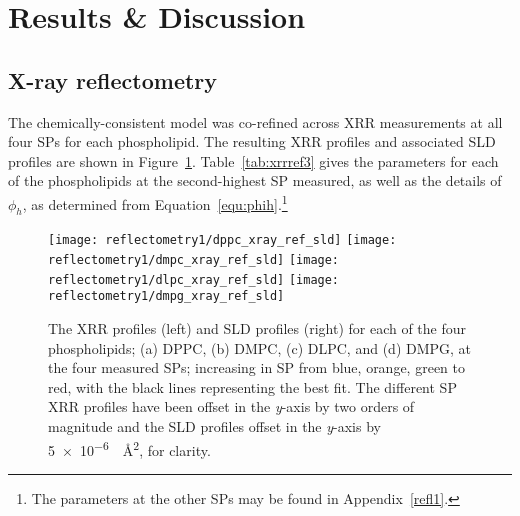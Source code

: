 \section{Results \& Discussion}
\subsection{X-ray reflectometry}
The chemically-consistent model was co-refined across XRR measurements at all four SPs for each phospholipid.
The resulting XRR profiles and associated SLD profiles are shown in Figure~\ref{fig:xrrref}.
Table~\ref{tab:xrrref3} gives the parameters for each of the phospholipids at the second-highest SP measured, as well as the details of $\phi_h$, as determined from Equation~\ref{equ:phih}.\footnote{The parameters at the other SPs may be found in Appendix~\ref{refl1}.}
%
\begin{figure}
\forcerectofloat
    \centering
    \texttt{[image: reflectometry1/dppc\_xray\_ref\_sld]}
    \texttt{[image: reflectometry1/dmpc\_xray\_ref\_sld]}
    \texttt{[image: reflectometry1/dlpc\_xray\_ref\_sld]}
    \texttt{[image: reflectometry1/dmpg\_xray\_ref\_sld]}
    \caption{The XRR profiles (left) and SLD profiles (right) for each of the four phospholipids; (a) DPPC, (b) DMPC, (c) DLPC, and (d) DMPG, at the four measured SPs; increasing in SP from blue, orange, green to red, with the black lines representing the best fit. The different SP XRR profiles have been offset in the \emph{y}-axis by two orders of magnitude and the SLD profiles offset in the \emph{y}-axis by \SI{5e-6}{\per\angstrom\squared}, for clarity.}
    \label{fig:xrrref}
\end{figure}
%
%
